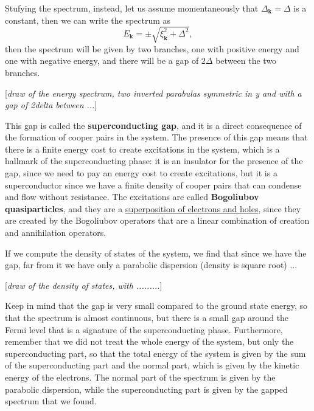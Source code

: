 Stufying the spectrum, instead, let us assume momentaneously that \(\Delta_{\mathbf{k}} = \Delta\) is a constant, then we can write the spectrum as
\[
    E_{\mathbf{k}} = \pm \sqrt{\xi_{\mathbf{k}}^2 + \Delta^2},
\]
then the spectrum will be given by two branches, one with positive energy and one with negative energy, and there will be a gap of \(2\Delta\) between the two branches.

    [\textit{draw of the energy spectrum, two inverted parabulas symmetric in y and with a gap of 2delta between ...}]

This gap is called the \textbf{superconducting gap}, and it is a direct consequence of the formation of cooper pairs in the system. The presence of this gap means that there is a finite energy cost to create excitations in the system, which is a hallmark of the superconducting phase: it is an insulator for the presence of the gap, since we need to pay an energy cost to create excitations, but it is a superconductor since we have a finite density of cooper pairs that can condense and flow without resistance. The excitations are called \textbf{Bogoliubov quasiparticles}, and they are a \uline{superposition of electrons and holes}, since they are created by the Bogoliubov operators that are a linear combination of creation and annihilation operators.

If we compute the density of states of the system, we find that since we have the gap, far from it we have only a parabolic dispersion (density is square root) ...

    [\textit{draw of the density of states, with .........}]

Keep in mind that the gap is very small compared to the ground state energy, so that the spectrum is almost continuous, but there is a small gap around the Fermi level that is a signature of the superconducting phase. Furthermore, remember that we did not treat the whole energy of the system, but only the superconducting part, so that the total energy of the system is given by the sum of the superconducting part and the normal part, which is given by the kinetic energy of the electrons. The normal part of the spectrum is given by the parabolic dispersion, while the superconducting part is given by the gapped spectrum that we found.

